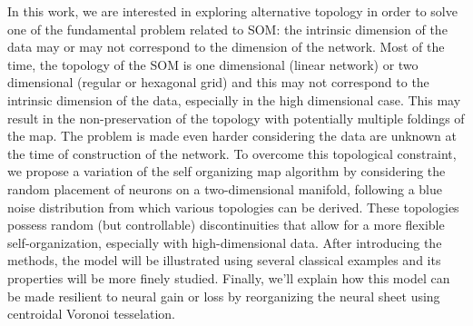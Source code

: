 In this work, we are interested in exploring alternative topology in order to
solve one of the fundamental problem related to SOM: the intrinsic dimension of
the data may or may not correspond to the dimension of the network. Most of
the time, the topology of the SOM is one dimensional (linear network) or two
dimensional (regular or hexagonal grid) and this may not correspond to the
intrinsic dimension of the data, especially in the high dimensional case. This
may result in the non-preservation of the topology \citep{Villmann:1999}
with potentially multiple foldings of the map. The problem is made even harder
considering the data are unknown at the time of construction of the network.
To overcome this topological constraint, we propose a variation of the self
organizing map algorithm by considering the random placement of neurons on a
two-dimensional manifold, following a blue noise distribution from which
various topologies can be derived. These topologies possess random (but
controllable) discontinuities that allow for a more flexible self-organization,
especially with high-dimensional data. After introducing the methods, the model
will be illustrated using several classical examples and its properties will be
more finely studied. Finally, we'll explain how this model can be made
resilient to neural gain or loss by reorganizing the neural sheet using
centroidal Voronoi tesselation.


